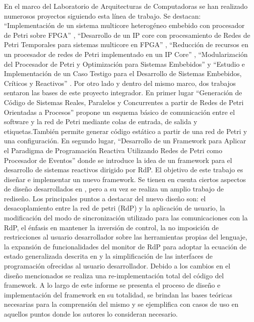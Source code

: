 En el marco del Laboratorio de Arquitecturas de Computadoras se han realizado
numerosos proyectos siguiendo esta línea de trabajo. Se destacan:
“Implementación de un sistema multicore heterogéneo embebido con procesador de
Petri sobre FPGA” \cite{Gallia-Pereyra}, “Desarrollo de un IP core con
procesamiento de Redes de Petri Temporales para sistemas multicore en FPGA”
\cite{Nonino-Pisetta-Micolini}, “Reducción de recursos en un procesador de redes
de Petri implementado en un IP Core” \cite{Birocco-Arlettaz-Micolini},
“Modularización del Procesador de Petri y Optimización para Sistemas Embebidos”
\cite{Daniele} y “Estudio e Implementación de un Caso Testigo para el
Desarrollo de Sistemas Embebidos, Críticos y Reactivos” \cite{Bentivegna-Ludemann}.
Por otro lado y dentro del mismo marco, dos trabajos sentaron las bases de este
proyecto integrador. En primer lugar “Generación de Código de Sistemas Reales,
Paralelos y Concurrentes a partir de Redes de Petri Orientadas a Procesos”
\cite{codegen} propone un esquema básico de comunicación entre el software y la
red de Petri mediante colas de entrada, de salida y etiquetas.También permite
generar código estático a partir de una red de Petri y una configuración. En
segundo lugar, “Desarrollo de un Framework para Aplicar el Paradigma de
Programación Reactiva Utilizando Redes de Petri como Procesador de
Eventos”\cite{chimp} donde se introduce la idea de un framework para el
desarrollo de sistemas reactivos dirigido por RdP.
El objetivo de este trabajo es diseñar e implementar un nuevo framework. Se
tienen en cuenta ciertos aspectos de diseño desarrollados en \cite{chimp},
pero a su vez se realiza un amplio trabajo de rediseño. Los principales puntos
a destacar del nuevo diseño son: el desacoplamiento entre la red de petri (RdP)
y la aplicación de usuario, la modificación del modo de sincronización utilizado
para las comunicaciones con la RdP, el énfasis en mantener la inversión de
control, la no imposición de restricciones al usuario desarrollador sobre las
herramientas propias del lenguaje, la expansión de funcionalidades del monitor
de RdP para adoptar la ecuación de estado generalizada descrita en
\cite{Ecuacion_generalizada_LAC} y la simplificación de las interfaces de
programación ofrecidas al usuario desarrollador. Debido a los cambios en el
diseño mencionados se realiza una re-implementación total del código del
framework. A lo largo de este informe se presenta el proceso de diseño e
implementación del framework en su totalidad, se brindan las bases teóricas
necesarias para la comprensión del mismo y se ejemplifica con casos de uso en
aquellos puntos donde los autores lo consideran necesario.
